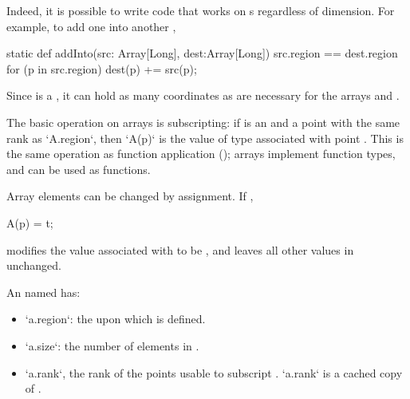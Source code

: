 \begin{ex}Indeed, it is possible to write code that works on s regardless 
of dimension.  For example, to add one   into another
, 
\begin{xten}
static def addInto(src: Array[Long], dest:Array[Long])
  {src.region == dest.region}
  {
    for (p in src.region) 
       dest(p) += src(p);
  }
\end{xten}
\noindent
Since  is a , it can hold as many coordinates as are
necessary for the arrays  and .
\end{ex}

The basic operation on arrays is subscripting: if  is an 
and  a point with the same rank as \xcd`A.region`, then
\xcd`A(p)`
is the value of type  associated with point .
This is the same operation as function application
(); arrays implement function types, and can be
used as functions.

Array elements can be changed by assignment. If , 
\begin{xten}
A(p) = t;
\end{xten}
modifies the value associated with  to be , and leaves all other
values in  unchanged.

An  named  has: 
\begin{itemize}
\item \xcd`a.region`: the  upon which  is defined.
\item \xcd`a.size`: the number of elements in .
\item \xcd`a.rank`, the rank of the points usable to subscript . 
      \xcd`a.rank` is a cached copy of 
      .
\end{itemize}

